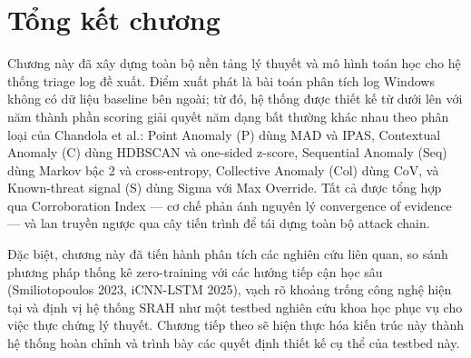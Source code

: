 \documentclass[../main.tex]{subfiles}
\begin{document}
\section{Tổng kết chương}
\label{section:2.7}

Chương này đã xây dựng toàn bộ nền tảng lý thuyết và mô hình toán học cho hệ thống triage log đề xuất. Điểm xuất phát là bài toán phân tích log Windows không có dữ liệu baseline bên ngoài; từ đó, hệ thống được thiết kế từ dưới lên với năm thành phần scoring giải quyết năm dạng bất thường khác nhau theo phân loại của Chandola et al.: Point Anomaly (P) dùng MAD và IPAS, Contextual Anomaly (C) dùng HDBSCAN và one-sided z-score, Sequential Anomaly (Seq) dùng Markov bậc 2 và cross-entropy, Collective Anomaly (Col) dùng CoV, và Known-threat signal (S) dùng Sigma với Max Override. Tất cả được tổng hợp qua Corroboration Index — cơ chế phản ánh nguyên lý convergence of evidence — và lan truyền ngược qua cây tiến trình để tái dựng toàn bộ attack chain.

Đặc biệt, chương này đã tiến hành phân tích các nghiên cứu liên quan, so sánh phương pháp thống kê zero-training với các hướng tiếp cận học sâu (Smiliotopoulos 2023, iCNN-LSTM 2025), vạch rõ khoảng trống công nghệ hiện tại và định vị hệ thống SRAH như một testbed nghiên cứu khoa học phục vụ cho việc thực chứng lý thuyết. Chương tiếp theo sẽ hiện thực hóa kiến trúc này thành hệ thống hoàn chỉnh và trình bày các quyết định thiết kế cụ thể của testbed này.

\end{document}
